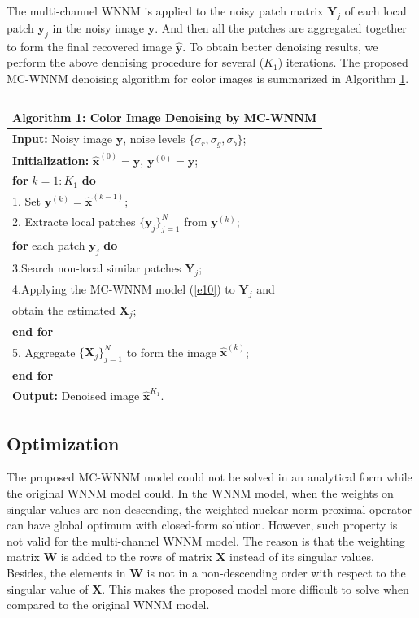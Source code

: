 \documentclass[10pt,twocolumn,letterpaper,sort&compress]{article}
\begin{document}
The multi-channel WNNM is applied to the noisy patch matrix $\mathbf{Y}_{j}$ of each local patch $\mathbf{y}_{j}$ in the noisy image $\mathbf{y}$. And then all the patches are aggregated together to form the final recovered image $\hat{\mathbf{y}}$. To obtain better denoising results, we perform the above denoising procedure for several ($K_{1}$) iterations. The proposed MC-WNNM denoising algorithm for color images is summarized in Algorithm \ref{a1}.
\begin{table}
\begin{tabular}{l}
\hline
\textbf{Algorithm 1}: Color Image Denoising by MC-WNNM
\\
\hline
\textbf{Input:} Noisy image $\mathbf{y}$, noise levels $\{\sigma_{r}, \sigma_{g}, \sigma_{b}\}$;
\\
\textbf{Initialization:} $\hat{\mathbf{x}}^{(0)}=\mathbf{y}$, $\mathbf{y}^{(0)}=\mathbf{y}$;
\\
\textbf{for} $k = 1:K_{1}$ \textbf{do}
\\
1. Set $\mathbf{y}^{(k)}=\hat{\mathbf{x}}^{(k-1)}$;
\\
2. Extracte local patches $\{\mathbf{y}_{j}\}_{j=1}^{N}$ from $\mathbf{y}^{(k)}$;
\\
\quad\textbf{for} each patch $\mathbf{y}_{j}$ \textbf{do}
\\
3.\quad Search non-local similar patches $\mathbf{Y}_{j}$;
\\
4.\quad Applying the MC-WNNM model (\ref{e10}) to $\mathbf{Y}_{j}$ and
\\
\quad \quad 
obtain the estimated $\mathbf{X}_{j}$;
\\
\quad\textbf{end for}
\\
5. Aggregate $\{\mathbf{X}_{j}\}_{j=1}^{N}$ to form the image $\hat{\mathbf{x}}^{(k)}$;
\\
\textbf{end for}
\\
\textbf{Output:} Denoised image $\hat{\mathbf{x}}^{K_{1}}$.
\\
\hline
\end{tabular}
\caption{}\vspace{-6mm}
\label{a1}
\end{table}


\subsection{Optimization}
The proposed MC-WNNM model could not be solved in an analytical form while the original WNNM model \cite{wnnmijcv} could. In the WNNM model, when the weights on singular values are non-descending, the weighted nuclear norm proximal operator \cite{wnnmijcv} can have global optimum with closed-form solution. However, such property is not valid for the multi-channel WNNM model. The reason is that the weighting matrix $\mathbf{W}$ is added to the rows of matrix $\mathbf{X}$ instead of its singular values. Besides, the elements in $\mathbf{W}$ is not in a non-descending order with respect to the singular value of $\mathbf{X}$. This makes the proposed model more difficult to solve when compared to the original WNNM model.
\end{document}
